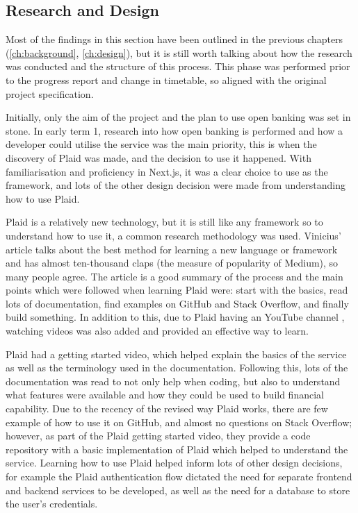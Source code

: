 \subsection{Research and Design}
Most of the findings in this section have been outlined in the previous chapters (\ref{ch:background}, \ref{ch:design}), but it is still worth talking about how the research was conducted and the structure of this process. This phase was performed prior to the progress report and change in timetable, so aligned with the original project specification.

Initially, only the aim of the project and the plan to use open banking was set in stone. In early term 1, research into how open banking is performed and how a developer could utilise the service was the main priority, this is when the discovery of Plaid was made, and the decision to use it happened. With familiarisation and proficiency in Next.js, it was a clear choice to use as the framework, and lots of the other design decision were made from understanding how to use Plaid.

Plaid is a relatively new technology, but it is still like any framework so to understand how to use it, a common research methodology was used. Vinicius' article \cite{FrameworkLearning} talks about the best method for learning a new language or framework and has almost ten-thousand claps (the measure of popularity of Medium), so many people agree. The article is a good summary of the process and the main points which were followed when learning Plaid were: start with the basics, read lots of documentation, find examples on GitHub and Stack Overflow, and finally build something. In addition to this, due to Plaid having an YouTube channel \cite{PlaidYouTube}, watching videos was also added and provided an effective way to learn. 

Plaid had a getting started video, which helped explain the basics of the service as well as the terminology used in the documentation. Following this, lots of the documentation was read to not only help when coding, but also to understand what features were available and how they could be used to build financial capability. Due to the recency of the revised way Plaid works, there are few example of how to use it on GitHub, and almost no questions on Stack Overflow; however, as part of the Plaid getting started video, they provide a code repository with a basic implementation of Plaid which helped to understand the service. Learning how to use Plaid helped inform lots of other design decisions, for example the Plaid authentication flow dictated the need for separate frontend and backend services to be developed, as well as the need for a database to store the user's credentials.

